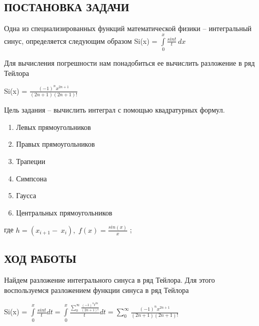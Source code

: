\documentclass[12pt,a4paper]{report}
\begin{document}
	{
	
	\begin{center}
		\chapter*{ПОСТАНОВКА ЗАДАЧИ}
	\end{center}
	
	Одна из специализированных функций математической физики – интегральный синус, определяется следующим образом
	Si(x) = $\displaystyle\int\limits_{0}^{x} \frac{sin t}{t} \,dx$
	
	Для вычисления погрешности нам понадобиться ее вычислить разложение в ряд Тейлора 
    
    Si(x) = $\displaystyle\frac{(-1)^n x^{2n+1}}{(2n+1)(2n+1)!}$

	Цель задания – вычислить интеграл с помощью квадратурных формул.

	\begin{enumerate}
		\item Левых прямоугольников 
		
		\item Правых прямоугольников 			
			
		\item Трапеции
			
		\item Симпсона  
			
		\item Гаусса
			
		\item Центральных прямоугольников
			
	\end{enumerate}
	где $h = (x_{i+1}-\ x_i), \;f(x)=\displaystyle\frac{sin(x)}{x}$ ;
	
	\begin{center}
		\chapter*{ХОД РАБОТЫ}
	\end{center}
	
	Найдем разложение интегрального синуса в ряд Тейлора. Для этого воспользуемся разложением функции синуса в ряд Тейлора
	
	Si(x) = $\displaystyle\int\limits_{0}^{x} \frac{sin t}{t} dt = \int\limits_{0}^{x} \frac{\sum_{0}^{∞} \frac{(-1)^{n} t ^ {2n}}{(2n + 1)!}}{t}dt = \sum_{0}^{∞} \frac{(-1)^n x^{2n+1}}{(2n+1)(2n+1)!}$

}
\end{document}

